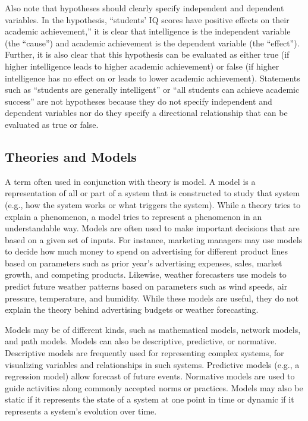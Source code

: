 Also note that hypotheses should clearly specify independent and dependent variables. In the hypothesis, ``students' IQ scores have positive effects on their academic achievement,'' it is clear that intelligence is the independent variable (the ``cause'') and academic achievement is the dependent variable (the ``effect''). Further, it is also clear that this hypothesis can be evaluated as either true (if higher intelligence leads to higher academic achievement) or false (if higher intelligence has no effect on or leads to lower academic achievement). Statements such as ``students are generally intelligent'' or ``all students can achieve academic success'' are not hypotheses because they do not specify independent and dependent variables nor do they specify a directional relationship that can be evaluated as true or false.

\subsection{Theories and Models}

A term often used in conjunction with theory is \gls{model}. A model is a representation of all or part of a system that is constructed to study that system (e.g., how the system works or what triggers the system). While a theory tries to explain a phenomenon, a model tries to represent a phenomenon in an understandable way. Models are often used to make important decisions that are based on a given set of inputs. For instance, marketing managers may use models to decide how much money to spend on advertising for different product lines based on parameters such as prior year's advertising expenses, sales, market growth, and competing products. Likewise, weather forecasters use models to predict future weather patterns based on parameters such as wind speeds, air pressure, temperature, and humidity. While these models are useful, they do not explain the theory behind advertising budgets or weather forecasting. 

Models may be of different kinds, such as mathematical models, network models, and path models. Models can also be descriptive, predictive, or normative. Descriptive models are frequently used for representing complex systems, for visualizing variables and relationships in such systems. Predictive models (e.g., a regression model) allow forecast of future events. Normative models are used to guide activities along commonly accepted norms or practices. Models may also be static if it represents the state of a system at one point in time or dynamic if it represents a system's evolution over time.

